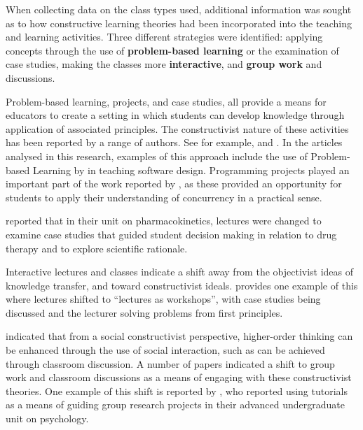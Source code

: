 When collecting data on the class types used, additional information was sought as to how constructive learning theories had been incorporated into the teaching and learning activities. Three different strategies were identified: applying concepts through the use of \textbf{problem-based learning} or the examination of case studies, making the classes more \textbf{interactive}, and \textbf{group work} and discussions. 

Problem-based learning, projects, and case studies, all provide a means for educators to create a setting in which students can develop knowledge through application of associated principles. The constructivist nature of these activities has been reported by a range of authors. See for example, \citet{Hendry:1999,Savery:1995} and \citet{Schmidt:2009}. In the articles analysed in this research, examples of this approach include the use of Problem-based Learning by \citet{warren2005teaching} in teaching software design. Programming projects played an important part of the work reported by \citet{Brabrand:2008}, as these provided an opportunity for students to apply their understanding of concurrency in a practical sense.

\citet{Davey:2002} reported that in their unit on pharmacokinetics, lectures were changed to examine case studies that guided student decision making in relation to drug therapy and to explore scientific rationale. 

Interactive lectures and classes indicate a shift away from the objectivist ideas of knowledge transfer, and toward constructivist ideals. \citet{shepherd2005weaving} provides one example of this where lectures shifted to ``lectures as workshops'', with case studies being discussed and the lecturer solving problems from first principles.

\citet{Palincsar:1998} indicated that from a social constructivist perspective, higher-order thinking can be enhanced through the use of social interaction, such as can be achieved through classroom discussion. A number of papers indicated a shift to group work and classroom discussions as a means of engaging with these constructivist theories. One example of this shift is reported by \citet{Israel:2007}, who reported using tutorials as a means of guiding group research projects in their advanced undergraduate unit on psychology.

